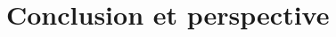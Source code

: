 \documentclass[11pt,a4paper]{report}
\begin{document}


\chapter{Conclusion et perspective}
\end{document}
